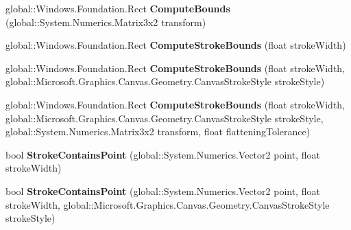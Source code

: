\begin{DoxyCompactItemize}
global\+::\+Windows.\+Foundation.\+Rect {\bfseries Compute\+Bounds} (global\+::\+System.\+Numerics.\+Matrix3x2 transform)
\item 
\mbox{\label{class_microsoft_1_1_graphics_1_1_canvas_1_1_geometry_1_1_canvas_geometry_ae0b4d41a78ebb80d02c862619a7d69cd}} 
global\+::\+Windows.\+Foundation.\+Rect {\bfseries Compute\+Stroke\+Bounds} (float stroke\+Width)
\item 
\mbox{\label{class_microsoft_1_1_graphics_1_1_canvas_1_1_geometry_1_1_canvas_geometry_a1944cea013afac73147a5ab67b3adf46}} 
global\+::\+Windows.\+Foundation.\+Rect {\bfseries Compute\+Stroke\+Bounds} (float stroke\+Width, global\+::\+Microsoft.\+Graphics.\+Canvas.\+Geometry.\+Canvas\+Stroke\+Style stroke\+Style)
\item 
\mbox{\label{class_microsoft_1_1_graphics_1_1_canvas_1_1_geometry_1_1_canvas_geometry_a2587e2485f5e40dce3e189b1e840c170}} 
global\+::\+Windows.\+Foundation.\+Rect {\bfseries Compute\+Stroke\+Bounds} (float stroke\+Width, global\+::\+Microsoft.\+Graphics.\+Canvas.\+Geometry.\+Canvas\+Stroke\+Style stroke\+Style, global\+::\+System.\+Numerics.\+Matrix3x2 transform, float flattening\+Tolerance)
\item 
\mbox{\label{class_microsoft_1_1_graphics_1_1_canvas_1_1_geometry_1_1_canvas_geometry_a487c9868385c05d9028ba59b0663e9f3}} 
bool {\bfseries Stroke\+Contains\+Point} (global\+::\+System.\+Numerics.\+Vector2 point, float stroke\+Width)
\item 
\mbox{\label{class_microsoft_1_1_graphics_1_1_canvas_1_1_geometry_1_1_canvas_geometry_add386d8e31ab0caf7b1b42d94e038fcd}} 
bool {\bfseries Stroke\+Contains\+Point} (global\+::\+System.\+Numerics.\+Vector2 point, float stroke\+Width, global\+::\+Microsoft.\+Graphics.\+Canvas.\+Geometry.\+Canvas\+Stroke\+Style stroke\+Style)
\item 
\mbox{\label{class_microsoft_1_1_graphics_1_1_canvas_1_1_geometry_1_1_canvas_geometry_a41adeb9ece02222f6a21e9635da34d5b}} 

\end{DoxyCompactItemize}
